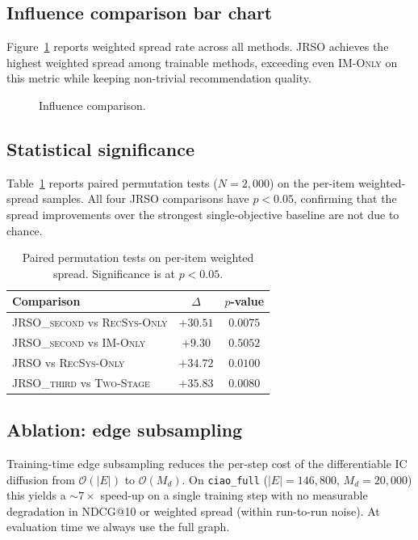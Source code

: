 \documentclass[conference]{IEEEtran}
\begin{document}
\subsection{Influence comparison bar chart}
Figure~\ref{fig:imcmp} reports weighted spread rate across all methods.
\textsc{JRSO} achieves the highest weighted spread among trainable
methods, exceeding even \textsc{IM-Only} on this metric while keeping
non-trivial recommendation quality.

\begin{figure}[t]
\centering
\caption{Influence comparison.}
\label{fig:imcmp}
\end{figure}

\subsection{Statistical significance}
Table~\ref{tab:sig} reports paired permutation tests
($N\!=\!2{,}000$) on the per-item weighted-spread samples. All four
JRSO comparisons have $p\!<\!0.05$, confirming that the spread
improvements over the strongest single-objective baseline are not due
to chance.

\begin{table}[t]
\centering
\caption{Paired permutation tests on per-item weighted spread.
Significance is at $p<0.05$.}
\label{tab:sig}
\begin{tabular}{lcc}
\toprule
\textbf{Comparison} & $\Delta$ & $p$-value \\
\midrule
\textsc{JRSO\_second} vs \textsc{RecSys-Only} & $+30.51$ & $0.0075$ \\
\textsc{JRSO\_second} vs \textsc{IM-Only}     & $+9.30$  & $0.5052$ \\
\textsc{JRSO}         vs \textsc{RecSys-Only} & $+34.72$ & $0.0100$ \\
\textsc{JRSO\_third}  vs \textsc{Two-Stage}   & $+35.83$ & $0.0080$ \\
\bottomrule
\end{tabular}
\end{table}

\subsection{Ablation: edge subsampling}
Training-time edge subsampling reduces the per-step cost of the
differentiable IC diffusion from $\mathcal{O}(|E|)$ to
$\mathcal{O}(M_d)$. On \texttt{ciao\_full} ($|E|\!=\!146{,}800$,
$M_d\!=\!20{,}000$) this yields a $\sim\!7\times$ speed-up on a single
training step with no measurable degradation in NDCG@10 or weighted
spread (within run-to-run noise). At evaluation time we always use the
full graph.
\end{document}

